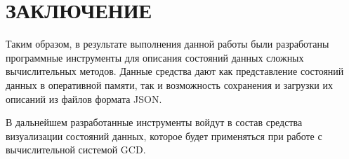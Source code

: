 \chapter*{ЗАКЛЮЧЕНИЕ}\label{chap_conclusion}

Таким образом, в результате выполнения данной работы были разработаны программные инструменты для описания состояний данных сложных вычислительных методов. Данные средства дают как представление состояний данных в оперативной памяти, так и возможность сохранения и загрузки их описаний из файлов формата JSON.

В дальнейшем разработанные инструменты войдут в состав средства визуализации состояний данных, которое будет применяться при работе с вычислительной системой GCD.

